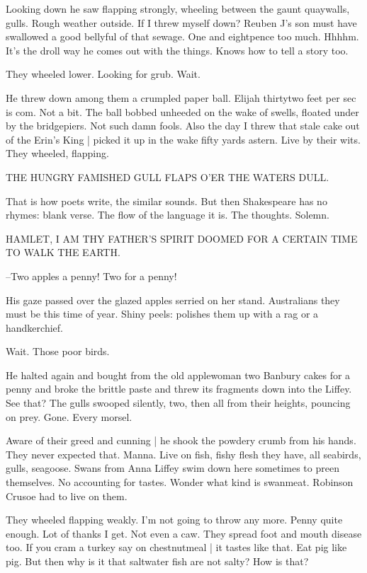 Looking down
he saw flapping strongly,
wheeling between the gaunt quaywalls,
gulls.
Rough weather outside.
If I threw myself down?
Reuben J's son must have swallowed a good bellyful of that sewage.
One and eightpence too much.
Hhhhm.
It's the droll way he comes out with the things.
Knows how to tell a story too.

They wheeled lower.
Looking for grub.
Wait.

He threw down among them a crumpled paper ball.
Elijah thirtytwo feet per sec is com.
Not a bit.
The ball bobbed unheeded on the wake of swells,
floated under by the bridgepiers.
Not such damn fools.
Also the day I threw that stale cake out of the Erin's King |
picked it up in the wake fifty yards astern.
Live by their wits.
They wheeled,
flapping.

    THE HUNGRY FAMISHED GULL
    FLAPS O'ER THE WATERS DULL.

That is how poets write, the similar sounds.
But then Shakespeare has no rhymes:
blank verse.
The flow of the language it is.
The thoughts.
Solemn.

    HAMLET, I AM THY FATHER'S SPIRIT
    DOOMED FOR A CERTAIN TIME TO WALK THE EARTH.

--Two apples a penny!
Two for a penny!

His gaze passed over the glazed apples serried on her stand.
Australians they must be this time of year.
Shiny peels:
polishes them up
with a rag or a handkerchief.

Wait.
Those poor birds.

He halted again and bought from the old applewoman
two Banbury cakes for a penny
and broke the brittle paste
and threw its fragments down into the Liffey.
See that?
The gulls swooped silently,
two,
then all from their heights,
pouncing on prey.
Gone.
Every morsel.

Aware of their greed and cunning |
he shook the powdery crumb from his hands.
They never expected that.
Manna.
Live on fish,
fishy flesh they have,
all seabirds,
gulls,
seagoose.
Swans from Anna Liffey swim down here sometimes to preen themselves.
No accounting for tastes.
Wonder what kind is swanmeat.
Robinson Crusoe had to live on them.

They wheeled flapping weakly.
I'm not going to throw any more.
Penny quite enough.
Lot of thanks I get.
Not even a caw.
They spread foot and mouth disease too.
If you cram a turkey say on chestnutmeal |
it tastes like that.
Eat pig like pig.
But then why is it that saltwater fish are not salty?
How is that?

